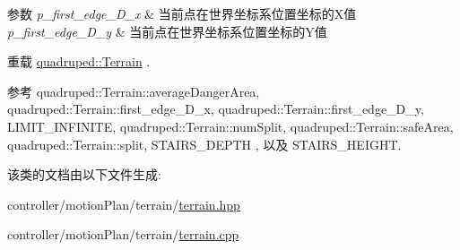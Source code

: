 \begin{DoxyParams}{参数}
{\em p\+\_\+first\+\_\+edge\+\_\+\+D\+\_\+x} & 当前点在世界坐标系位置坐标的\+X值 \\
\hline
{\em p\+\_\+first\+\_\+edge\+\_\+\+D\+\_\+y} & 当前点在世界坐标系位置坐标的\+Y值 \\
\hline
\end{DoxyParams}


重载 \hyperlink{classquadruped_1_1Terrain}{quadruped\+::\+Terrain} .



参考 quadruped\+::\+Terrain\+::average\+Danger\+Area, quadruped\+::\+Terrain\+::first\+\_\+edge\+\_\+\+D\+\_\+x, quadruped\+::\+Terrain\+::first\+\_\+edge\+\_\+\+D\+\_\+y, L\+I\+M\+I\+T\+\_\+\+I\+N\+F\+I\+N\+I\+TE, quadruped\+::\+Terrain\+::num\+Split, quadruped\+::\+Terrain\+::safe\+Area, quadruped\+::\+Terrain\+::split, S\+T\+A\+I\+R\+S\+\_\+\+D\+E\+P\+TH , 以及 S\+T\+A\+I\+R\+S\+\_\+\+H\+E\+I\+G\+HT.



该类的文档由以下文件生成\+:\begin{DoxyCompactItemize}
\item 
controller/motion\+Plan/terrain/\hyperlink{terrain_8hpp}{terrain.\+hpp}\item 
controller/motion\+Plan/terrain/\hyperlink{terrain_8cpp}{terrain.\+cpp}\end{DoxyCompactItemize}
